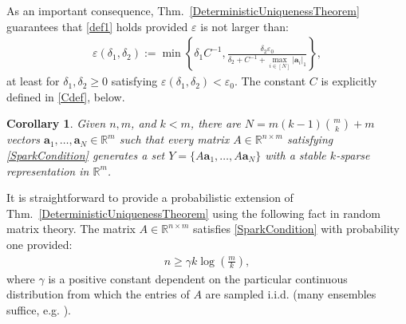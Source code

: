 \documentclass[journal, twocolumn]{IEEEtran}
\newtheorem{corollary}{Corollary}
\newtheorem{remark}{Remark}
\begin{document}

As an important consequence, Thm.~\ref{DeterministicUniquenessTheorem} guarantees that \eqref{def1} holds provided $\varepsilon$ is not larger than:
\begin{align*}
\varepsilon(\delta_1, \delta_2) := \min \left\{ \delta_1 C^{-1}, \frac{ \delta_2 \varepsilon_0}{\delta_2 + C^{-1} + \max_{i \in [N]} |\mathbf{a}_i|_1} \right\},
\end{align*}
%
at least for $\delta_1, \delta_2 \geq 0$ satisfying $\varepsilon(\delta_1, \delta_2) < \varepsilon_0$. The constant $C$ is explicitly defined in \eqref{Cdef}, below. 

\begin{corollary}\label{DeterministicUniquenessCorollary}
Given $n, m$, and $k < m$, there are $N =  m(k-1){m \choose k}+m$ vectors \mbox{$\mathbf{a}_1, \ldots, \mathbf{a}_N \in \mathbb{R}^m$} such that every matrix $A \in \mathbb{R}^{n \times m}$ satisfying \eqref{SparkCondition} generates a set $Y = \{A\mathbf{a}_1, \ldots, A\mathbf{a}_N\}$ with a stable $k$-sparse representation in $\mathbb R^m$.
\end{corollary}

It is straightforward to provide a probabilistic extension of Thm.~\ref{DeterministicUniquenessTheorem} using the following fact in random matrix theory.  The matrix $A \in \mathbb{R}^{n \times m}$ satisfies \eqref{SparkCondition} with probability one
provided:
\begin{align}\label{CScondition}
n \geq \gamma k\log\left(\frac{m}{k}\right),
\end{align}
where $\gamma$ is a positive constant dependent on the particular continuous distribution from which the entries of $A$ are sampled i.i.d. (many ensembles suffice, e.g. \cite[Sec.~4]{Baraniuk08}). 
\end{document}
